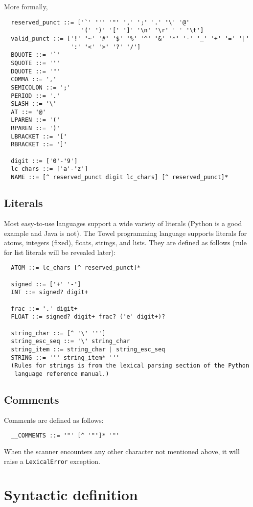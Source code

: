 \documentclass{article}
\begin{document}
More formally,
\begin{verbatim}
  reserved_punct ::= ['`' ''' '"' ',' ';' '.' '\' '@' 
                      '(' ')' '[' ']' '\n' '\r' ' ' '\t']
  valid_punct ::= ['!' '~' '#' '$' '%' '^' '&' '*' '-' '_' '+' '=' '|'
                   ':' '<' '>' '?' '/']
  BQUOTE ::= '`'
  SQUOTE ::= '''
  DQUOTE ::= '"'
  COMMA ::= ','
  SEMICOLON ::= ';'
  PERIOD ::= '.'
  SLASH ::= '\'
  AT ::= '@'
  LPAREN ::= '('
  RPAREN ::= ')'
  LBRACKET ::= '['
  RBRACKET ::= ']'

  digit ::= ['0'-'9']
  lc_chars ::= ['a'-'z']
  NAME ::= [^ reserved_punct digit lc_chars] [^ reserved_punct]*
\end{verbatim}

\subsection{Literals}

Most easy-to-use languages support a wide variety of literals (Python is a good example and Java is not). The Towel programming language supports literals for atoms, integers (fixed), floats, strings, and lists. They are defined as follows (rule for list literals will be revealed later):
\begin{verbatim}
  ATOM ::= lc_chars [^ reserved_punct]*

  signed ::= ['+' '-']
  INT ::= signed? digit+

  frac ::= '.' digit+
  FLOAT ::= signed? digit+ frac? ('e' digit+)?

  string_char ::= [^ '\' ''']
  string_esc_seq ::= '\' string_char
  string_item ::= string_char | string_esc_seq
  STRING ::= ''' string_item* '''
  (Rules for strings is from the lexical parsing section of the Python
   language reference manual.)
\end{verbatim}

\subsection{Comments}

Comments are defined as follows:
\begin{verbatim}
  __COMMENTS ::= '"' [^ '"']* '"'
\end{verbatim}

When the scanner encounters any other character not mentioned above, it will raise a \texttt{LexicalError} exception.

\section{Syntactic definition}
\end{document}
